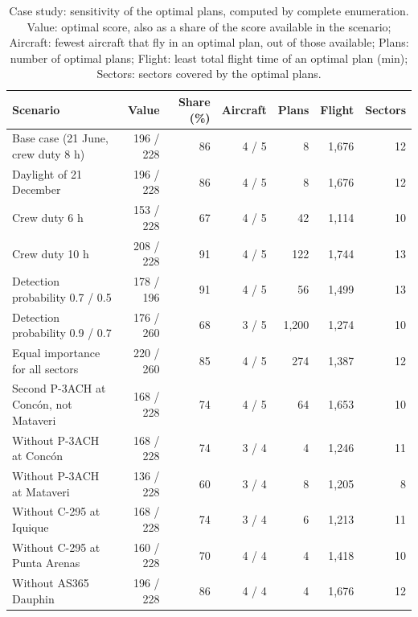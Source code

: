 \begin{table}[!ht]
\centering
\caption{Case study: sensitivity of the optimal plans, computed by complete enumeration. Value: optimal score, also as a share of the score available in the scenario; Aircraft: fewest aircraft that fly in an optimal plan, out of those available; Plans: number of optimal plans; Flight: least total flight time of an optimal plan (min); Sectors: sectors covered by the optimal plans.\label{tab10}}
\footnotesize\linespread{1}\selectfont\setlength{\tabcolsep}{4pt}
\begin{tabular*}{\textwidth}{@{\extracolsep\fill}lrrrrrr@{\extracolsep\fill}}
\toprule
\textbf{Scenario} & \textbf{Value} & \textbf{Share (\%)} & \textbf{Aircraft} & \textbf{Plans} & \textbf{Flight} & \textbf{Sectors} \\
\midrule
Base case (21 June, crew duty 8 h) & 196 / 228 & 86 & 4 / 5 & 8 & 1,676 & 12 \\
\midrule
Daylight of 21 December & 196 / 228 & 86 & 4 / 5 & 8 & 1,676 & 12 \\
\addlinespace[2pt]
Crew duty 6 h & 153 / 228 & 67 & 4 / 5 & 42 & 1,114 & 10 \\
Crew duty 10 h & 208 / 228 & 91 & 4 / 5 & 122 & 1,744 & 13 \\
\addlinespace[2pt]
Detection probability 0.7 / 0.5 & 178 / 196 & 91 & 4 / 5 & 56 & 1,499 & 13 \\
Detection probability 0.9 / 0.7 & 176 / 260 & 68 & 3 / 5 & 1,200 & 1,274 & 10 \\
\addlinespace[2pt]
Equal importance for all sectors & 220 / 260 & 85 & 4 / 5 & 274 & 1,387 & 12 \\
\addlinespace[2pt]
Second P-3ACH at Conc\'on, not Mataveri & 168 / 228 & 74 & 4 / 5 & 64 & 1,653 & 10 \\
\addlinespace[2pt]
Without P-3ACH at Conc\'on & 168 / 228 & 74 & 3 / 4 & 4 & 1,246 & 11 \\
Without P-3ACH at Mataveri & 136 / 228 & 60 & 3 / 4 & 8 & 1,205 & 8 \\
Without C-295 at Iquique & 168 / 228 & 74 & 3 / 4 & 6 & 1,213 & 11 \\
Without C-295 at Punta Arenas & 160 / 228 & 70 & 4 / 4 & 4 & 1,418 & 10 \\
Without AS365 Dauphin & 196 / 228 & 86 & 4 / 4 & 4 & 1,676 & 12 \\
\bottomrule
\end{tabular*}
\end{table}
